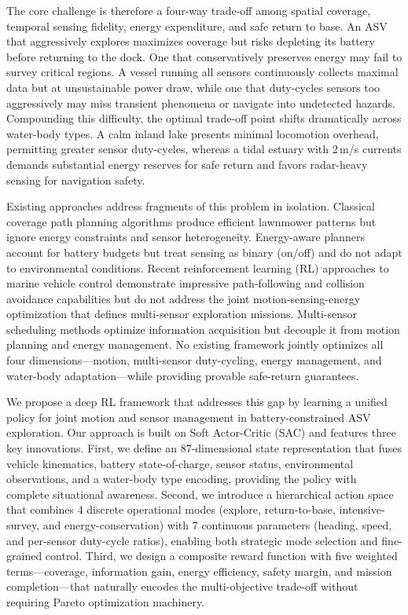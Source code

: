 \documentclass[conference]{IEEEtran}
\begin{document}
The core challenge is therefore a four-way trade-off among spatial coverage, temporal sensing fidelity, energy expenditure, and safe return to base. An ASV that aggressively explores maximizes coverage but risks depleting its battery before returning to the dock. One that conservatively preserves energy may fail to survey critical regions. A vessel running all sensors continuously collects maximal data but at unsustainable power draw, while one that duty-cycles sensors too aggressively may miss transient phenomena or navigate into undetected hazards. Compounding this difficulty, the optimal trade-off point shifts dramatically across water-body types. A calm inland lake presents minimal locomotion overhead, permitting greater sensor duty-cycles, whereas a tidal estuary with 2\,m/s currents demands substantial energy reserves for safe return and favors radar-heavy sensing for navigation safety.

Existing approaches address fragments of this problem in isolation. Classical coverage path planning algorithms \cite{Galceran2013CPPSurvey} produce efficient lawnmower patterns but ignore energy constraints and sensor heterogeneity. Energy-aware planners \cite{Arafat2023EnergyAware, Sun2025EnergyCPP} account for battery budgets but treat sensing as binary (on/off) and do not adapt to environmental conditions. Recent reinforcement learning (RL) approaches to marine vehicle control \cite{Meyer2021SACNavigation, Zhao2022DDPGASV, Woo2023RLUUV} demonstrate impressive path-following and collision avoidance capabilities but do not address the joint motion-sensing-energy optimization that defines multi-sensor exploration missions. Multi-sensor scheduling methods \cite{Wu2020SensorScheduling, Hollinger2014ActiveSensing} optimize information acquisition but decouple it from motion planning and energy management. No existing framework jointly optimizes all four dimensions---motion, multi-sensor duty-cycling, energy management, and water-body adaptation---while providing provable safe-return guarantees.

We propose a deep RL framework that addresses this gap by learning a unified policy for joint motion and sensor management in battery-constrained ASV exploration. Our approach is built on Soft Actor-Critic (SAC) \cite{Haarnoja2018SAC} and features three key innovations. First, we define an 87-dimensional state representation that fuses vehicle kinematics, battery state-of-charge, sensor status, environmental observations, and a water-body type encoding, providing the policy with complete situational awareness. Second, we introduce a hierarchical action space that combines 4 discrete operational modes (explore, return-to-base, intensive-survey, and energy-conservation) with 7 continuous parameters (heading, speed, and per-sensor duty-cycle ratios), enabling both strategic mode selection and fine-grained control. Third, we design a composite reward function with five weighted terms---coverage, information gain, energy efficiency, safety margin, and mission completion---that naturally encodes the multi-objective trade-off without requiring Pareto optimization machinery.
\end{document}
